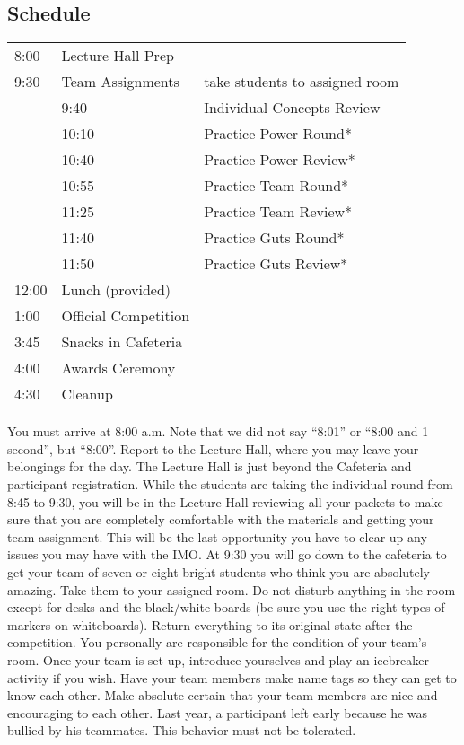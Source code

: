 \documentclass[11pt]{article}
\begin{document}
\begin{small}
\section{Schedule}
\begin{tabular}{l l l }
  8:00 & Lecture Hall Prep & \\
  9:30 & Team Assignments & take students to assigned room \\
  & 9:40 & Individual Concepts Review \\
  & 10:10 & Practice Power Round* \\
  & 10:40 & Practice Power Review* \\
  & 10:55 & Practice Team Round* \\
  & 11:25 & Practice Team Review* \\
  & 11:40 & Practice Guts Round* \\
  & 11:50 & Practice Guts Review* \\
 12:00 & Lunch (provided) \\
  1:00 & Official Competition \\
  3:45 & Snacks in Cafeteria \\
  4:00 & Awards Ceremony \\
  4:30 & Cleanup \\
\end{tabular}

\vspace{0.5cm}

\noindent You must arrive at 8:00 a.m. Note that we did not say ``8:01'' or ``8:00 and 1 second'', but ``8:00''. 
Report to the Lecture Hall, where you may leave your belongings for the day. The Lecture Hall is just beyond the Cafeteria and participant registration.
While the students are taking the individual round from 8:45 to 9:30, you will be in the Lecture Hall reviewing all your packets to make sure that you
are completely comfortable with the materials and getting your team assignment. This will be the last opportunity you have to clear up any issues you
may have with the IMO. At 9:30 you will go down to the cafeteria to get your team of seven or eight bright students who think you are absolutely amazing.
Take them to your assigned room. Do not disturb anything in the room except for desks and the black/white boards (be sure you use the right types
of markers on whiteboards). Return everything to its original state after the competition. You personally are responsible for the condition of your team's room.
Once your team is set up, introduce yourselves and play an icebreaker activity if you wish. Have your team members make name tags so they can get to know each other.
Make absolute certain that your team members are nice and encouraging to each other. Last year, a participant left early because he was bullied by his teammates.
This behavior must not be tolerated.


\end{small}
\end{document}
